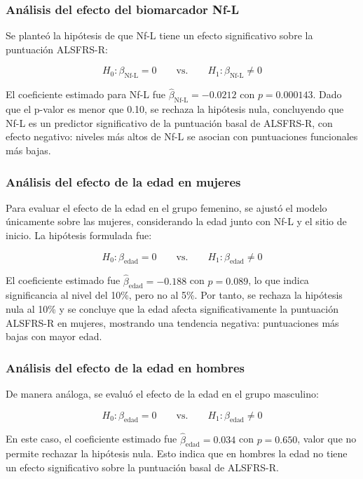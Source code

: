 \documentclass[12pt]{article} %
\begin{document}
\subsubsection*{Análisis del efecto del biomarcador Nf-L}

Se planteó la hipótesis de que Nf-L tiene un efecto significativo sobre la puntuación ALSFRS-R:

\[
H_0: \beta_{\text{Nf-L}} = 0 \qquad \text{vs.} \qquad H_1: \beta_{\text{Nf-L}} \neq 0
\]

El coeficiente estimado para Nf-L fue $\hat{\beta}_{\text{Nf-L}} = -0.0212$ con $p = 0.000143$. Dado que el p-valor es menor que 0.10, se rechaza la hipótesis nula, concluyendo que Nf-L es un predictor significativo de la puntuación basal de ALSFRS-R, con efecto negativo: niveles más altos de Nf-L se asocian con puntuaciones funcionales más bajas.

\subsubsection*{Análisis del efecto de la edad en mujeres}

Para evaluar el efecto de la edad en el grupo femenino, se ajustó el modelo únicamente sobre las mujeres, considerando la edad junto con Nf-L y el sitio de inicio. La hipótesis formulada fue:

\[
H_0: \beta_{\text{edad}} = 0 \qquad \text{vs.} \qquad H_1: \beta_{\text{edad}} \neq 0
\]

El coeficiente estimado fue $\hat{\beta}_{\text{edad}} = -0.188$ con $p = 0.089$, lo que indica significancia al nivel del 10\%, pero no al 5\%. Por tanto, se rechaza la hipótesis nula al 10\% y se concluye que la edad afecta significativamente la puntuación ALSFRS-R en mujeres, mostrando una tendencia negativa: puntuaciones más bajas con mayor edad.

\subsubsection*{Análisis del efecto de la edad en hombres}

De manera análoga, se evaluó el efecto de la edad en el grupo masculino:

\[
H_0: \beta_{\text{edad}} = 0 \qquad \text{vs.} \qquad H_1: \beta_{\text{edad}} \neq 0
\]

En este caso, el coeficiente estimado fue $\hat{\beta}_{\text{edad}} = 0.034$ con $p = 0.650$, valor que no permite rechazar la hipótesis nula. Esto indica que en hombres la edad no tiene un efecto significativo sobre la puntuación basal de ALSFRS-R.
\end{document}
